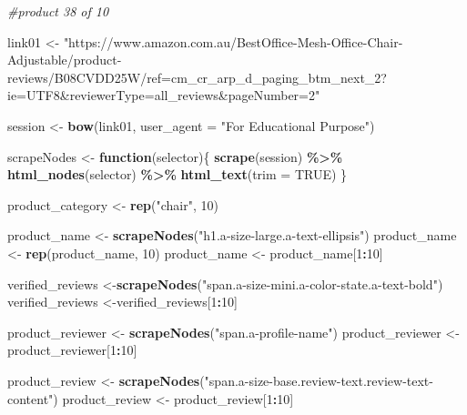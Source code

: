 \documentclass[
]{article}
\newenvironment{Shaded}{\begin{snugshade}}{\end{snugshade}}
\newcommand{\AttributeTok}[1]{\textcolor[rgb]{0.13,0.29,0.53}{#1}}
\newcommand{\CommentTok}[1]{\textcolor[rgb]{0.56,0.35,0.01}{\textit{#1}}}
\newcommand{\ConstantTok}[1]{\textcolor[rgb]{0.56,0.35,0.01}{#1}}
\newcommand{\ControlFlowTok}[1]{\textcolor[rgb]{0.13,0.29,0.53}{\textbf{#1}}}
\newcommand{\DecValTok}[1]{\textcolor[rgb]{0.00,0.00,0.81}{#1}}
\newcommand{\FunctionTok}[1]{\textcolor[rgb]{0.13,0.29,0.53}{\textbf{#1}}}
\newcommand{\NormalTok}[1]{#1}
\newcommand{\OtherTok}[1]{\textcolor[rgb]{0.56,0.35,0.01}{#1}}
\newcommand{\SpecialCharTok}[1]{\textcolor[rgb]{0.81,0.36,0.00}{\textbf{#1}}}
\newcommand{\StringTok}[1]{\textcolor[rgb]{0.31,0.60,0.02}{#1}}
\begin{document}
\begin{Shaded}
\begin{Highlighting}[]
\CommentTok{\#product 38 of 10}

\NormalTok{link01 }\OtherTok{\textless{}{-}} \StringTok{"https://www.amazon.com.au/BestOffice{-}Mesh{-}Office{-}Chair{-}Adjustable/product{-}reviews/B08CVDD25W/ref=cm\_cr\_arp\_d\_paging\_btm\_next\_2?ie=UTF8\&reviewerType=all\_reviews\&pageNumber=2"}


\NormalTok{  session }\OtherTok{\textless{}{-}} \FunctionTok{bow}\NormalTok{(link01,}
               \AttributeTok{user\_agent =} \StringTok{"For Educational Purpose"}\NormalTok{)}

\NormalTok{  scrapeNodes }\OtherTok{\textless{}{-}} \ControlFlowTok{function}\NormalTok{(selector)\{}
    \FunctionTok{scrape}\NormalTok{(session) }\SpecialCharTok{\%\textgreater{}\%}
      \FunctionTok{html\_nodes}\NormalTok{(selector) }\SpecialCharTok{\%\textgreater{}\%}
      \FunctionTok{html\_text}\NormalTok{(}\AttributeTok{trim =} \ConstantTok{TRUE}\NormalTok{)}
\NormalTok{  \}}

\NormalTok{  product\_category }\OtherTok{\textless{}{-}} \FunctionTok{rep}\NormalTok{(}\StringTok{"chair"}\NormalTok{, }\DecValTok{10}\NormalTok{)}

\NormalTok{  product\_name }\OtherTok{\textless{}{-}} \FunctionTok{scrapeNodes}\NormalTok{(}\StringTok{"h1.a{-}size{-}large.a{-}text{-}ellipsis"}\NormalTok{)}
\NormalTok{  product\_name }\OtherTok{\textless{}{-}} \FunctionTok{rep}\NormalTok{(product\_name, }\DecValTok{10}\NormalTok{)}
\NormalTok{  product\_name }\OtherTok{\textless{}{-}}\NormalTok{ product\_name[}\DecValTok{1}\SpecialCharTok{:}\DecValTok{10}\NormalTok{]}
  
\NormalTok{  verified\_reviews }\OtherTok{\textless{}{-}}\FunctionTok{scrapeNodes}\NormalTok{(}\StringTok{"span.a{-}size{-}mini.a{-}color{-}state.a{-}text{-}bold"}\NormalTok{)}
\NormalTok{  verified\_reviews }\OtherTok{\textless{}{-}}\NormalTok{verified\_reviews[}\DecValTok{1}\SpecialCharTok{:}\DecValTok{10}\NormalTok{]}
  
\NormalTok{  product\_reviewer }\OtherTok{\textless{}{-}} \FunctionTok{scrapeNodes}\NormalTok{(}\StringTok{"span.a{-}profile{-}name"}\NormalTok{)}
\NormalTok{  product\_reviewer }\OtherTok{\textless{}{-}}\NormalTok{ product\_reviewer[}\DecValTok{1}\SpecialCharTok{:}\DecValTok{10}\NormalTok{]}
  
\NormalTok{  product\_review }\OtherTok{\textless{}{-}} \FunctionTok{scrapeNodes}\NormalTok{(}\StringTok{"span.a{-}size{-}base.review{-}text.review{-}text{-}content"}\NormalTok{)}
\NormalTok{  product\_review }\OtherTok{\textless{}{-}}\NormalTok{ product\_review[}\DecValTok{1}\SpecialCharTok{:}\DecValTok{10}\NormalTok{]}
  

\end{Highlighting}
\end{Shaded}
\end{document}
